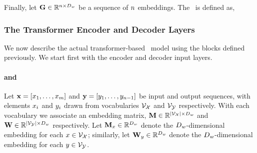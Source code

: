            \noindent Finally, let $\mathbf{G} \in \mathbb{R}^{n \times D_{w}}$ be a sequence of $n$ embeddings. The \encoderattentionblock~is
           defined as,\\



\subsubsection{The Transformer Encoder and Decoder Layers}

We now describe the actual transformer-based \sequencetosequence~model
using the blocks defined previously. We start first with the encoder 
and decoder input layers.


\paragraph{ and }
           Let $\mathbf{x} = \left[ x_1,\ldots,x_{m}\right]$ and 
           $\mathbf{y} = \left[y_1,\ldots,y_{n-1}\right]$ be 
           input and output sequences, with elements $x_i$ and $y_i$
           drawn from vocabularies $\mathcal{V}_{\mathcal{X}}$ and $\mathcal{V}_{\mathcal{Y}}$ respectively.
           With each vocabulary we associate an embedding matrix,
          $\mathbf{M} \in \mathbb{R}^{{\left\vert \mathcal{V}_{\mathcal{X}} \right\vert} \times D_{w}}$ 
          and 
          $\mathbf{W} \in \mathbb{R}^{{\left\vert \mathcal{V}_{\mathcal{Y}} \right\vert} \times D_{w}}$ 
          respectively. Let $\mathbf{M}_{x} \in \mathbb{R}^{D_{w}}$ denote the $D_{w}$-dimensional  embedding for each $x \in \mathcal{V}_{\mathcal{X}}$; similarly,  
let $\mathbf{W}_y \in \mathbb{R}^{D_{w}}$ denote the $D_{w}$-dimensional  embedding for each $y \in \mathcal{V}_{\mathcal{Y}}$.

